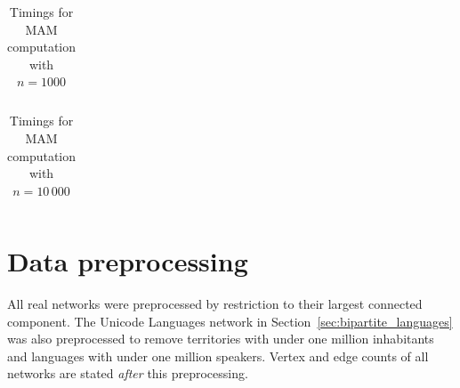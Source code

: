 \begin{table}[H]
\centering
\renewcommand{\arraystretch}{1.5}
\setlength\tabcolsep{0.2em}
\scriptsize
	\begin{tabular}{ |c|c|c|c|c|c|c|c|c|c|c|c|c|c|c|c|c|c| }
		\hline	
		
	\end{tabular}
	\caption{Timings for MAM computation with $n=1000$}
	\label{tab:timing_n_1000}
\end{table}


\begin{table}[H]
\centering
\renewcommand{\arraystretch}{1.5}
\setlength\tabcolsep{0.2em}
\scriptsize
	\begin{tabular}{ |c|c|c|c|c|c|c|c|c|c|c|c|c|c|c|c|c|c| }
		\hline	
		
	\end{tabular}
	\caption{Timings for MAM computation with $n=10 \, 000$}
	\label{tab:timing_n_10000}
\end{table}




\section{Data preprocessing} \label{sec:notes_preprocessing}

All real networks were preprocessed by restriction to their largest connected component. The Unicode Languages network in Section~\ref{sec:bipartite_languages} was also preprocessed to remove territories with under one million inhabitants and languages with under one million speakers. Vertex and edge counts of all networks are stated \emph{after} this preprocessing.





